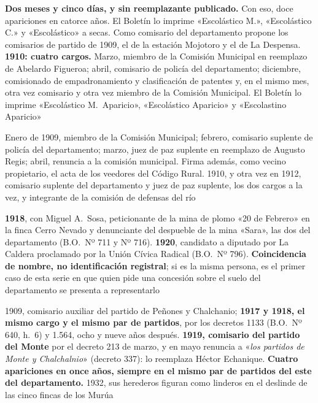 \begin{personas}
\textbf{Dos meses y cinco días, y sin reemplazante publicado.} Con eso, doce apariciones en catorce años. El Boletín lo imprime «Escolástico M.», «Escolástico C.» y «Escolástico» a secas. Como comisario del departamento propone los comisarios de partido de 1909, el de la estación Mojotoro y el de La Despensa. \textbf{1910: cuatro cargos.} Marzo, miembro de la Comisión Municipal en reemplazo de Abelardo Figueroa; abril, comisario de policía del departamento; diciembre, comisionado de empadronamiento y clasificación de patentes y, en el mismo mes, otra vez comisario y otra vez miembro de la Comisión Municipal. El Boletín lo imprime «Escolástico M.\ Aparicio», «Escolástico Aparicio» y «Escolastino Aparicio»

\item[{\textbf{Jacinto Guerrero\index{Guerrero, Jacinto}}}] Enero de 1909, miembro de la Comisión Municipal; febrero, comisario suplente de policía del departamento; marzo, juez de paz suplente en reemplazo de Augusto Regis; abril, renuncia a la comisión municipal. Firma además, como vecino propietario, el acta de los veedores del Código Rural. 1910, y otra vez en 1912, comisario suplente del departamento y juez de paz suplente, los dos cargos a la vez, y integrante de la comisión de defensas del río

\item[{\textbf{Dermidio Arancibia}}] \textbf{1918}, con Miguel A.\ Sosa, peticionante de la mina de plomo «20 de Febrero» en la finca Cerro Nevado y denunciante del despueble de la mina «Sara», las dos del departamento (B.O.\ Nº 711 y Nº 716). \textbf{1920}, candidato a diputado por La Caldera proclamado por la Unión Cívica Radical (B.O.\ Nº 796). \textbf{Coincidencia de nombre, no identificación registral}; si es la misma persona, es el primer caso de esta serie en que quien pide una concesión sobre el suelo del departamento se presenta a representarlo

\item[{\textbf{Liborio Guerrero\index{Guerrero, Liborio}}}] 1909, comisario auxiliar del partido de Peñones y Chalchanio; \textbf{1917 y 1918, el mismo cargo y el mismo par de partidos}, por los decretos 1133 (B.O.\ Nº 640, h.\ 6) y 1.564, ocho y nueve años después. \textbf{1919, comisario del partido del Monte} por el decreto 213 de marzo, y en mayo renuncia a «\textit{los partidos de Monte y Chalchalnio}» (decreto 337): lo reemplaza Héctor Echanique. \textbf{Cuatro apariciones en once años, siempre en el mismo par de partidos del este del departamento.} 1932, sus herederos figuran como linderos en el deslinde de las cinco fincas de los Murúa


\end{personas}
